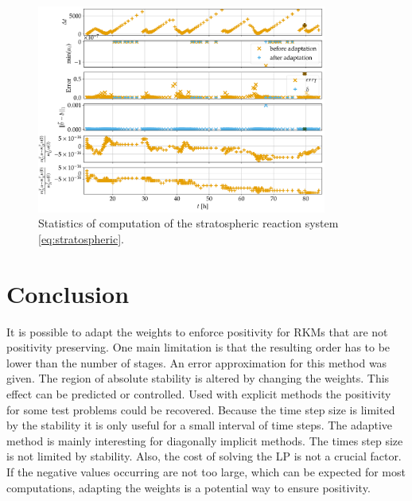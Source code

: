 \documentclass[a4paper]{article}
\numberwithin{equation}{section}
\theoremstyle{plain}
\theoremstyle{definition}
\numberwithin{theorem}{section}
\newcommand{\1}{\mathbbm{1}}
\begin{document}
\begin{figure}
\centering
\includegraphics[width=0.85\textwidth]{plots/Stratospheric_stepsize_b.pdf}
\caption{Statistics of computation of the stratospheric reaction system
         \eqref{eq:stratospheric}.}
\label{fig:Stats_Strat}
\end{figure}


\section{Conclusion} \label{sec:conclusion}

It is possible to adapt the weights to enforce positivity for RKMs that are not positivity preserving.
One main limitation is that the resulting order has to be lower than the number of stages.
An error approximation for this method was given.
The region of absolute stability is altered by changing the weights. This effect can be predicted or controlled.
Used with explicit methods the positivity for some test problems could be recovered.
Because the time step size is limited by the stability it is only useful for a small interval of time steps.
The adaptive method is mainly interesting for diagonally implicit methods.
The times step size is not limited by stability.
Also, the cost of solving the LP is not a crucial factor.
If the negative values occurring are not too large, which can be expected for most computations, adapting the weights is a potential way to ensure positivity.


\printbibliography
\end{document}
